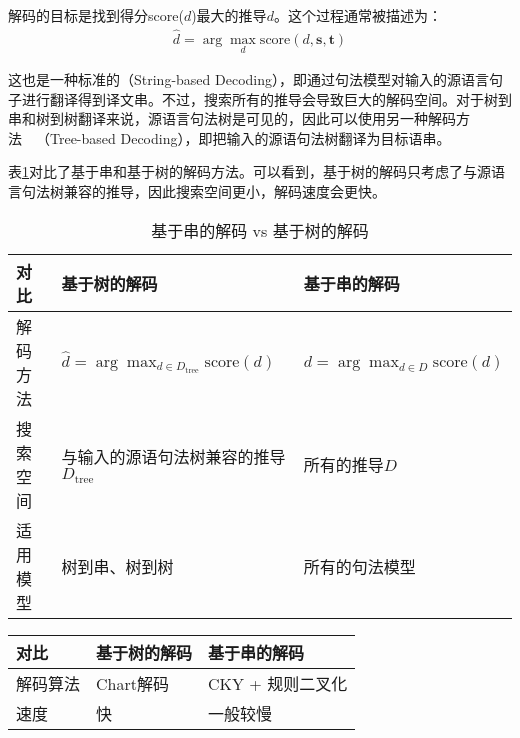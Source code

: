 \parinterval 解码的目标是找到得分score($d$)最大的推导$d$。这个过程通常被描述为：
\begin{eqnarray}
\hat{d} = \arg\max_d \textrm{score} (d,\mathbf{s},\mathbf{t})
\label{eq:4-34}
\end{eqnarray}

\parinterval 这也是一种标准的{\small{}}（String-based Decoding），即通过句法模型对输入的源语言句子进行翻译得到译文串。不过，搜索所有的推导会导致巨大的解码空间。对于树到串和树到树翻译来说，源语言句法树是可见的，因此可以使用另一种解码方法\ \dash \ {\small{}}（Tree-based Decoding），即把输入的源语句法树翻译为目标语串。

\parinterval 表\ref{tab:4-4}对比了基于串和基于树的解码方法。可以看到，基于树的解码只考虑了与源语言句法树兼容的推导，因此搜索空间更小，解码速度会更快。

\begin{table}[htp]{
\begin{center}
\caption{基于串的解码 vs 基于树的解码}
\label{tab:4-4}
{
\begin{tabular}{l | p{16.5em} l}
对比 & 基于树的解码 & 基于串的解码 \\
\hline
\rule{0pt}{15pt}解码方法 & $\hat{d} = \arg\max_{d \in D_{\textrm{tree}}} \textrm{score} (d)$ & $\hat{d} = \arg\max_{d \in D} \textrm{score} (d)$ \\
\rule{0pt}{15pt}搜索空间 & 与输入的源语句法树兼容的推导$D_{\textrm{tree}}$ & 所有的推导$D$ \\
\rule{0pt}{15pt}适用模型 & 树到串、树到树 & 所有的句法模型
\end{tabular}
}
\end{center}
}\end{table}
\begin{table}[htp]{
\begin{center}
\vspace{1em}
{
\begin{tabular}{l | p{16.5em} l}
对比 & 基于树的解码 & 基于串的解码 \\
\hline

\rule{0pt}{15pt}解码算法 & Chart解码 & CKY + 规则二叉化 \\
\rule{0pt}{15pt}速度 & 快 & 一般较慢
\end{tabular}
}
\end{center}
}\end{table}


